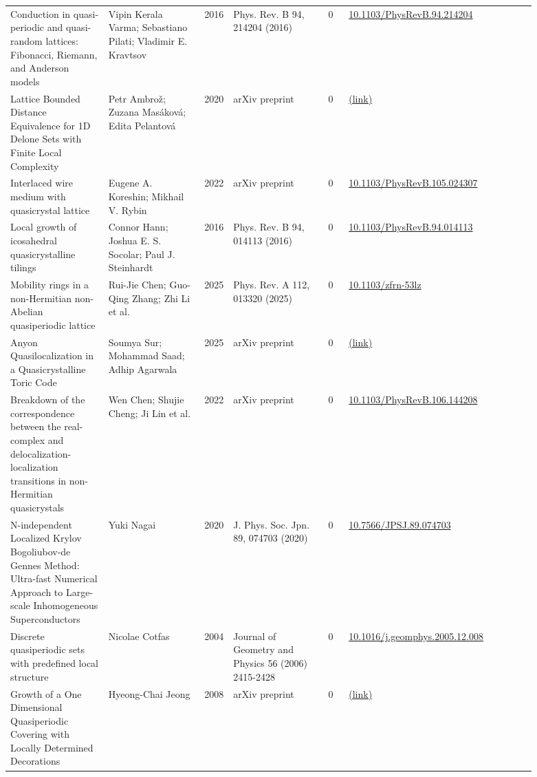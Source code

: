 \documentclass[10pt,a4paper]{article}
\begin{document}
{\begin{longtable}{p{0.192\linewidth}p{0.192\linewidth}p{0.043\linewidth}p{0.192\linewidth}p{0.043\linewidth}p{0.132\linewidth}p{0.096\linewidth}}
Conduction in quasi-periodic and quasi-random lattices: Fibonacci, Riemann, and Anderson models & Vipin Kerala Varma; Sebastiano Pilati; Vladimir E. Kravtsov & 2016 & Phys. Rev. B 94, 214204 (2016) & 0 & \href{https://doi.org/10.1103/PhysRevB.94.214204}{10.1103/PhysRevB.94.214204} &  \\
Lattice Bounded Distance Equivalence for 1D Delone Sets with Finite Local Complexity & Petr Ambrož; Zuzana Masáková; Edita Pelantová & 2020 & arXiv preprint & 0 & \href{http://arxiv.org/abs/2010.03884v1}{(link)} &  \\
Interlaced wire medium with quasicrystal lattice & Eugene A. Koreshin; Mikhail V. Rybin & 2022 & arXiv preprint & 0 & \href{https://doi.org/10.1103/PhysRevB.105.024307}{10.1103/PhysRevB.105.024307} &  \\
Local growth of icosahedral quasicrystalline tilings & Connor Hann; Joshua E. S. Socolar; Paul J. Steinhardt & 2016 & Phys. Rev. B 94, 014113 (2016) & 0 & \href{https://doi.org/10.1103/PhysRevB.94.014113}{10.1103/PhysRevB.94.014113} &  \\
Mobility rings in a non-Hermitian non-Abelian quasiperiodic lattice & Rui-Jie Chen; Guo-Qing Zhang; Zhi Li et al. & 2025 & Phys. Rev. A 112, 013320 (2025) & 0 & \href{https://doi.org/10.1103/zfrn-53lz}{10.1103/zfrn-53lz} &  \\
Anyon Quasilocalization in a Quasicrystalline Toric Code & Soumya Sur; Mohammad Saad; Adhip Agarwala & 2025 & arXiv preprint & 0 & \href{http://arxiv.org/abs/2511.17144v2}{(link)} &  \\
Breakdown of the correspondence between the real-complex and delocalization-localization transitions in non-Hermitian quasicrystals & Wen Chen; Shujie Cheng; Ji Lin et al. & 2022 & arXiv preprint & 0 & \href{https://doi.org/10.1103/PhysRevB.106.144208}{10.1103/PhysRevB.106.144208} &  \\
N-independent Localized Krylov Bogoliubov-de Gennes Method: Ultra-fast Numerical Approach to Large-scale Inhomogeneous Superconductors & Yuki Nagai & 2020 & J. Phys. Soc. Jpn. 89, 074703 (2020) & 0 & \href{https://doi.org/10.7566/JPSJ.89.074703}{10.7566/JPSJ.89.074703} &  \\
Discrete quasiperiodic sets with predefined local structure & Nicolae Cotfas & 2004 & Journal of Geometry and Physics 56 (2006) 2415-2428 & 0 & \href{https://doi.org/10.1016/j.geomphys.2005.12.008}{10.1016/j.geomphys.2005.12.008} &  \\
Growth of a One Dimensional Quasiperiodic Covering with Locally Determined Decorations & Hyeong-Chai Jeong & 2008 & arXiv preprint & 0 & \href{http://arxiv.org/abs/0801.3509v1}{(link)} &  \\

\end{longtable}}
\end{document}
